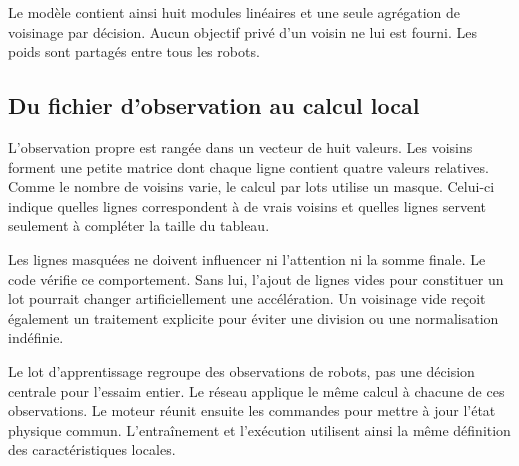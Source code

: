 Le modèle contient ainsi huit modules linéaires et une seule agrégation de voisinage par décision. Aucun objectif privé d'un voisin ne lui est fourni. Les poids sont partagés entre tous les robots.


\subsection{Du fichier d'observation au calcul local}
L'observation propre est rangée dans un vecteur de huit valeurs. Les voisins forment une petite matrice dont chaque ligne contient quatre valeurs relatives. Comme le nombre de voisins varie, le calcul par lots utilise un masque. Celui-ci indique quelles lignes correspondent à de vrais voisins et quelles lignes servent seulement à compléter la taille du tableau.

Les lignes masquées ne doivent influencer ni l'attention ni la somme finale. Le code vérifie ce comportement. Sans lui, l'ajout de lignes vides pour constituer un lot pourrait changer artificiellement une accélération. Un voisinage vide reçoit également un traitement explicite pour éviter une division ou une normalisation indéfinie.

Le lot d'apprentissage regroupe des observations de robots, pas une décision centrale pour l'essaim entier. Le réseau applique le même calcul à chacune de ces observations. Le moteur réunit ensuite les commandes pour mettre à jour l'état physique commun. L'entraînement et l'exécution utilisent ainsi la même définition des caractéristiques locales.


